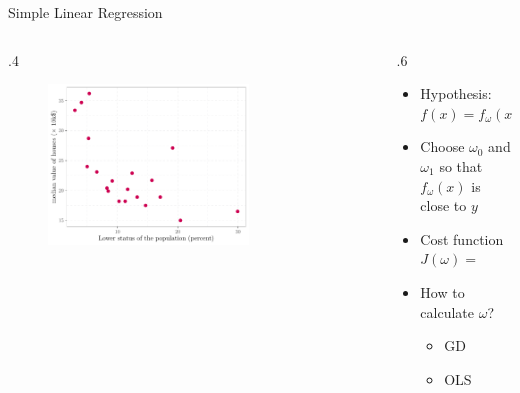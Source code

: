\documentclass[
  9pt,
  ignorenonframetext,
  aspectratio=169,
  t, dvipsnames]{beamer}
\providecommand{\tightlist}{%
  \setlength{\itemsep}{0pt}\setlength{\parskip}{0pt}}\usepackage{longtable,booktabs,array}
\theoremstyle{definition}
\def\begincols{\begin{columns}}
\def\begincol{\begin{column}}
\def\endcol{\end{column}}
\def\endcols{\end{columns}}
\begin{document}
\begin{frame}{Simple Linear Regression}
\protect\hypertarget{simple-linear-regression}{}
\begincols
\begincol{.4\textwidth}

\begin{figure}

{\centering \includegraphics[width=0.7\textwidth,height=\textheight]{CM1_Machine_Learning_files/figure-beamer/unnamed-chunk-8-1.pdf}

}

\end{figure}

\endcol

\begincol{.6\textwidth}

\begin{itemize}
\tightlist
\item
  Hypothesis: \(f(x) = f_{\omega}(x) = \omega_0 + \omega_1 x\)
\item
  Choose \(\omega_0\) and \(\omega_1\) so that \(f_{\omega}(x)\) is
  close to \(y\)
\item
  \alert{Cost function} \(J(\omega) =\)
\item
  How to calculate \(\omega\)?

  \begin{itemize}
  \tightlist
  \item
    GD
  \item
    OLS
  \end{itemize}
\end{itemize}

\endcol
\endcols
\end{frame}
\end{document}
